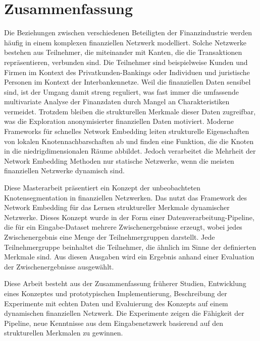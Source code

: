 \chapter*{Zusammenfassung}
\label{cha:zusammenfassung}
Die Beziehungen zwischen verschiedenen Beteiligten der Finanzindustrie werden häufig in einem komplexen finanziellen Netzwerk modelliert. Solche Netzwerke bestehen aus Teilnehmer, die miteinander mit Kanten, die die Transaktionen repräsentieren, verbunden sind. Die Teilnehmer sind beispielweise Kunden und Firmen im Kontext des Privatkunden-Bankings oder Individuen und juristische Personen im Kontext der Interbankennetze. Weil die finanziellen Daten sensibel sind, ist der Umgang damit streng reguliert, was fast immer die umfassende multivariate Analyse der Finanzdaten durch Mangel an Charakteristiken vermeidet. Trotzdem bleiben die strukturellen Merkmale dieser Daten zugreifbar, was die Exploration anonymisierter finanziellen Daten motiviert. Moderne Frameworks für schnelles Network Embedding leiten strukturelle Eigenschaften von lokalen Knotennachbarschaften ab und finden eine Funktion, die die Knoten in die niedrigdimensionalen Räume abbildet. Jedoch verarbeitet die Mehrheit der Network Embedding Methoden nur statische Netzwerke, wenn die meisten finanziellen Netzwerke dynamisch sind.

Diese Masterarbeit präsentiert ein Konzept der unbeobachteten Knotensegmentation in finanziellen Netzwerken. Das nutzt das Framework des Network Embedding für das Lernen struktureller Merkmale dynamischer Netzwerke. Dieses Konzept wurde in der Form einer Datenverarbeitung-Pipeline, die für ein Eingabe-Dataset mehrere Zwischenergebnisse erzeugt, wobei jedes Zwischenergebnis eine Menge der Teilnehmergruppen darstellt. Jede Teilnehmergruppe beinhaltet die Teilnehmer, die ähnlich im Sinne der definierten Merkmale sind. Aus diesen Ausgaben wird ein Ergebnis anhand einer Evaluation der Zwischenergebnisse ausgewählt.

Diese Arbeit besteht aus der Zusammenfassung früherer Studien, Entwicklung eines Konzeptes und prototypischen Implementierung, Beschreibung der Experimente mit echten Daten und Evaluierung des Konzepts auf einem dynamischen finanziellen Netzwerk. Die Experimente zeigen die Fähigkeit der Pipeline, neue Kenntnisse aus dem Eingabenetzwerk basierend auf den strukturellen Merkmalen zu gewinnen.
